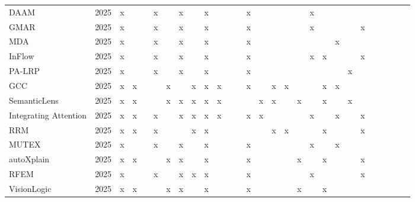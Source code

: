 \begin{tabular}{ll|cc|ccc|cc|cccc|ccccc|ccccc|ccccc}
DAAM \cite{liaoDynamicAccumulatedAttention2025} & 2025 & x &  &  & x &  & x &  & x &  &  &  & x &  &  &  &  & x &  &  &  &  &  &  &  &  &  \\
GMAR \cite{joGMARGradientDrivenMultiHead2025} & 2025 & x &  &  & x &  & x &  & x &  &  &  & x &  &  &  &  & x &  &  &  & x &  &  &  &  &  \\
MDA \cite{walkerMetricDrivenAttributionsVision2024} & 2025 & x &  &  & x &  & x &  & x &  &  &  & x &  &  &  &  &  &  & x &  &  &  &  &  &  &  \\
InFlow \cite{walkerExplainingViTsUsing2025} & 2025 & x &  &  & x &  & x &  & x &  &  &  & x &  &  &  &  & x & x &  &  & x &  &  &  &  &  \\
PA-LRP \cite{bakishRevisitingLRPPositional2025} & 2025 & x &  &  & x &  & x &  & x &  &  &  & x &  &  &  &  &  &  &  & x &  &  &  &  &  &  \\
GCC \cite{kwonGranularConceptCircuits2025} & 2025 & x & x &  &  & x &  & x & x & x &  &  & x &  & x & x &  &  & x & x &  &  &  &  &  &  &  \\
SemanticLens \cite{dreyerMechanisticUnderstandingValidation2025} & 2025 & x & x &  &  & x & x & x & x & x &  &  &  & x & x &  & x &  & x &  & x &  &  &  &  &  &  \\
Integrating Attention \cite{eggenIntegratingAttentionExplanation2025} & 2025 & x & x &  & x &  & x & x & x & x &  &  & x & x &  &  &  & x &  & x &  & x &  &  &  &  &  \\
RRM \cite{kimInterpretingVisionTransformers2025} & 2025 & x & x &  & x &  &  & x & x &  &  &  &  &  & x & x &  &  & x &  &  & x &  &  &  &  &  \\
MUTEX \cite{marchettiMultiplexNetworkbasedRepresentation2025} & 2025 & x &  &  & x &  & x &  & x &  &  &  & x &  &  &  &  & x &  & x &  &  &  &  &  &  &  \\
autoXplain \cite{nguyenNovelFrameworkAutomated2025} & 2025 & x & x &  &  & x & x &  & x &  &  &  & x &  &  &  & x &  & x &  &  & x &  &  &  &  &  \\
RFEM \cite{ayyarThereMoreAttention2025} & 2025 & x &  &  & x &  & x & x & x &  &  &  & x &  &  &  &  & x &  &  &  & x &  &  &  &  &  \\
VisionLogic \cite{gengLearningInterpretableLogic2025} & 2025 & x & x &  &  & x & x &  & x &  &  &  & x &  &  &  & x &  & x &  &  &  &  &  &  &  &  \\
\bottomrule
\end{tabular}
